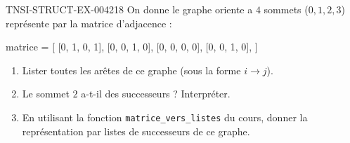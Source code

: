 \begin{exercice}{TNSI-STRUCT-EX-004}{2}{18}
On donne le graphe oriente a $4$ sommets ($0,1,2,3$) représente par la matrice d'adjacence :
\begin{python}
matrice = [
    [0, 1, 0, 1],
    [0, 0, 1, 0],
    [0, 0, 0, 0],
    [0, 0, 1, 0],
]
\end{python}
\begin{enumerate}
  \item Lister toutes les arêtes de ce graphe (sous la forme $i \to j$).
  \item Le sommet $2$ a-t-il des successeurs ? Interpréter.
  \item En utilisant la fonction \lstinline{matrice_vers_listes} du cours, donner la représentation par listes de successeurs de ce graphe.
\end{enumerate}
\end{exercice}

